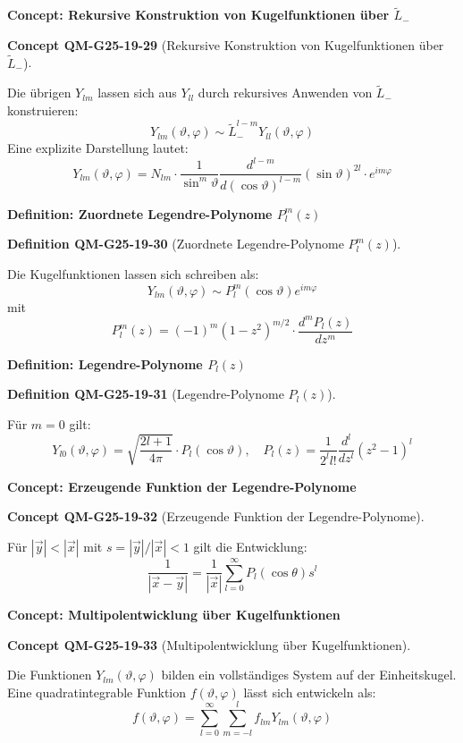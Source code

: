 \documentclass[10pt, letterpaper]{article}
\newcommand{\CustomHeading}[3]{%
  \par\medskip\noindent%
  \textbf{#1 #2} \textnormal{(#3)}.\enskip%
}
\newenvironment{DEF}[2]{\begin{unitbox}\CustomHeading{Definition}{#1}{#2}}{\end{unitbox}}
\newenvironment{CONC}[2]{\begin{unitbox}\CustomHeading{Concept}{#1}{#2}}{\end{unitbox}}
\begin{document}
\textbf{Concept: Rekursive Konstruktion von Kugelfunktionen über \(\tilde{L}_-\)}


\begin{CONC}{QM-G25-19-29}{Rekursive Konstruktion von Kugelfunktionen über \(\tilde{L}_-\)}
Die übrigen \(Y_{lm}\) lassen sich aus \(Y_{ll}\) durch rekursives Anwenden von \(\tilde{L}_-\) konstruieren:
$$
Y_{lm}(\vartheta, \varphi) \sim \tilde{L}_-^{l-m} Y_{ll}(\vartheta, \varphi)
$$
Eine explizite Darstellung lautet:
$$
Y_{lm}(\vartheta, \varphi) = N_{lm} \cdot \frac{1}{\sin^m \vartheta} \frac{d^{l - m}}{d (\cos \vartheta)^{l - m}} (\sin \vartheta)^{2l} \cdot e^{i m \varphi}
$$
\end{CONC}


\textbf{Definition: Zuordnete Legendre-Polynome \(P_l^m(z)\)}  


\begin{DEF}{QM-G25-19-30}{Zuordnete Legendre-Polynome \(P_l^m(z)\)}
Die Kugelfunktionen lassen sich schreiben als:
$$
Y_{lm}(\vartheta, \varphi) \sim P_l^m(\cos \vartheta) e^{i m \varphi}
$$
mit
$$
P_l^m(z) = (-1)^m (1 - z^2)^{m/2} \cdot \frac{d^m P_l(z)}{dz^m}
$$
\end{DEF}


\textbf{Definition: Legendre-Polynome \(P_l(z)\)}  


\begin{DEF}{QM-G25-19-31}{Legendre-Polynome \(P_l(z)\)}
Für \(m = 0\) gilt:
$$
Y_{l0}(\vartheta, \varphi) = \sqrt{\frac{2l+1}{4\pi}} \cdot P_l(\cos \vartheta), \quad
P_l(z) = \frac{1}{2^l l!} \frac{d^l}{dz^l}(z^2 - 1)^l
$$
\end{DEF}



\textbf{Concept: Erzeugende Funktion der Legendre-Polynome}  

\begin{CONC}{QM-G25-19-32}{Erzeugende Funktion der Legendre-Polynome}
Für \(|\vec{y}| < |\vec{x}|\) mit \(s = |\vec{y}| / |\vec{x}| < 1\) gilt die Entwicklung:
$$
\frac{1}{|\vec{x} - \vec{y}|} = \frac{1}{|\vec{x}|} \sum_{l=0}^{\infty} P_l(\cos \theta) s^l
$$
\end{CONC}



\textbf{Concept: Multipolentwicklung über Kugelfunktionen} 

\begin{CONC}{QM-G25-19-33}{Multipolentwicklung über Kugelfunktionen}
Die Funktionen \(Y_{lm}(\vartheta, \varphi)\) bilden ein vollständiges System auf der Einheitskugel. Eine quadratintegrable Funktion \(f(\vartheta, \varphi)\) lässt sich entwickeln als:
$$
f(\vartheta, \varphi) = \sum_{l=0}^{\infty} \sum_{m=-l}^{l} f_{lm} Y_{lm}(\vartheta, \varphi)
$$
\end{CONC}
\end{document}
